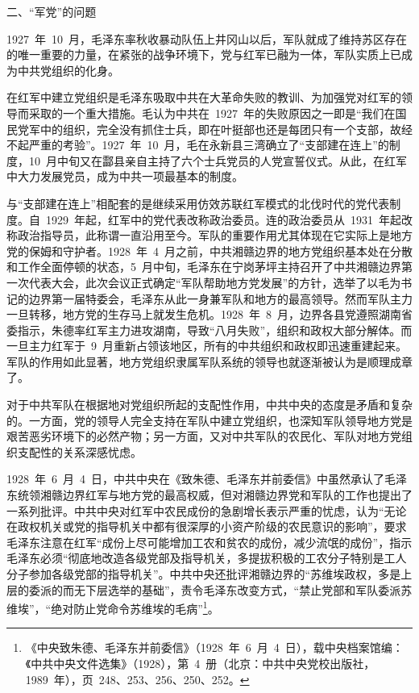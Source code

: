 二、“军党”的问题

1927~年~10~月，毛泽东率秋收暴动队伍上井冈山以后，军队就成了维持苏区存在的唯一重要的力量，在紧张的战争环境下，党与红军已融为一体，军队实质上已成为中共党组织的化身。

在红军中建立党组织是毛泽东吸取中共在大革命失败的教训、为加强党对红军的领导而采取的一个重大措施。毛认为中共在~1927~年的失败原因之一即是“我们在国民党军中的组织，完全没有抓住士兵，即在叶挺部也还是每团只有一个支部，故经不起严重的考验”。1927~年~10~月，毛在永新县三湾确立了“支部建在连上”的制度，10~月中旬又在酃县亲自主持了六个士兵党员的人党宣誓仪式。从此，在红军中大力发展党员，成为中共一项最基本的制度。

与“支部建在连上”相配套的是继续采用仿效苏联红军模式的北伐时代的党代表制度。自~1929~年起，红军中的党代表改称政治委员。连的政治委员从~1931~年起改称政治指导员，此称谓一直沿用至今。军队的重要作用尤其体现在它实际上是地方党的保姆和守护者。1928~年~4~月之前，中共湘赣边界的地方党组织基本处在分散和工作全面停顿的状态，5~月中旬，毛泽东在宁岗茅坪主持召开了中共湘赣边界第一次代表大会，此次会议正式确定“军队帮助地方党发展”的方针，选举了以毛为书记的边界第一届特委会，毛泽东从此一身兼军队和地方的最高领导。然而军队主力一旦转移，地方党的生存马上就发生危机。1928~年~8~月，边界各县党遵照湖南省委指示，朱德率红军主力进攻湖南，导致“八月失败”，组织和政权大部分解体。而一旦主力红军于~9~月重新占领该地区，所有的中共组织和政权即迅速重建起来。军队的作用如此显著，地方党组织隶属军队系统的领导也就逐渐被认为是顺理成章了。

对于中共军队在根据地对党组织所起的支配性作用，中共中央的态度是矛盾和复杂的。一方面，党的领导人完全支持在军队中建立党组织，也深知军队领导地方党是艰苦恶劣环境下的必然产物；另一方面，又对中共军队的农民化、军队对地方党组织支配性的关系深感忧虑。

1928~年~6~月~4~日，中共中央在《致朱德、毛泽东并前委信》中虽然承认了毛泽东统领湘赣边界红军与地方党的最高权威，但对湘赣边界党和军队的工作也提出了一系列批评。中共中央对红军中农民成份的急剧增长表示严重的忧虑，认为“无论在政权机关或党的指导机关中都有很深厚的小资产阶级的农民意识的影响”，要求毛泽东注意在红军“成份上尽可能增加工农和贫农的成份，减少流氓的成份”，指示毛泽东必须“彻底地改造各级党部及指导机关，多提拔积极的工农分子特别是工人分子参加各级党部的指导机关”。中共中央还批评湘赣边界的“苏维埃政权，多是上层的委派的而无下层选举的基础”，责令毛泽东改变方式，“禁止党部和军队委派苏维埃”，“绝对防止党命令苏维埃的毛病”\footnote{《中央致朱德、毛泽东并前委信》（1928~年~6~月~4~日），载中央档案馆编：《中共中央文件选集》（1928），第~4~册（北京：中共中央党校出版社，1989~年），页~248、253、256、250、252。}。

